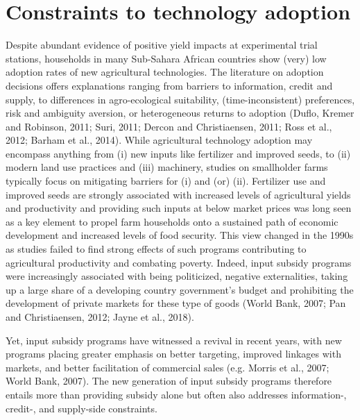 \section{Constraints to technology adoption}
Despite abundant evidence of positive yield impacts at experimental trial stations, households in many Sub-Sahara African countries show (very) low adoption rates of new agricultural technologies. The literature on adoption decisions offers explanations ranging from barriers to information, credit and supply, to differences in agro-ecological suitability, (time-inconsistent) preferences, risk and ambiguity aversion, or heterogeneous returns to adoption (Duflo, Kremer and Robinson, 2011; Suri, 2011; Dercon and Christiaensen, 2011; Ross et al., 2012; Barham et al., 2014). While agricultural technology adoption may encompass anything from (i) new inputs like fertilizer and improved seeds, to (ii) modern land use practices and (iii) machinery, studies on smallholder farms typically focus on mitigating barriers for (i) and (or) (ii). Fertilizer use and improved seeds are strongly associated with increased levels of agricultural yields and productivity and providing such inputs at below market prices was long seen as a key element to propel farm households onto a sustained path of economic development and increased levels of food security. This view changed in the 1990s as studies failed to find strong effects of such programs contributing to agricultural productivity and combating poverty. Indeed, input subsidy programs were increasingly associated with being politicized, negative externalities, taking up a large share of a developing country government’s budget and prohibiting the development of private markets for these type of goods (World Bank, 2007; Pan and Christiaensen, 2012; Jayne et al., 2018).

Yet, input subsidy programs have witnessed a revival in recent years, with new programs placing greater emphasis on better targeting, improved linkages with markets, and better facilitation of commercial sales (e.g. Morris et al., 2007; World Bank, 2007). The new generation of input subsidy programs therefore entails more than providing subsidy alone but often also addresses information-, credit-, and supply-side constraints. 

